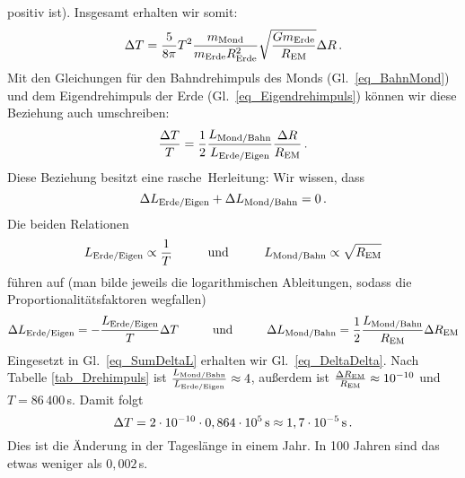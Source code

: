 positiv ist).  Insgesamt erhalten wir somit:
\begin{equation}
       \Delta T = \frac{5}{8 \pi} T^2  
                \frac{m_{\rm Mond}}{m_{\rm Erde}R_{\rm Erde}^2} \sqrt{ \frac{G m_{\rm Erde}}{R_{\rm EM}}} \Delta R \, .
\end{equation}
Mit den Gleichungen f\"ur den Bahndrehimpuls des Monds (Gl.\ \ref{eq_BahnMond}) und dem Eigendrehimpuls
der Erde (Gl.\ \ref{eq_Eigendrehimpuls}) k\"onnen wir diese Beziehung auch umschreiben:
\begin{equation}
\label{eq_DeltaDelta}
      \frac{ \Delta T}{T}  = \frac{1}{2}  
                \frac{L_{\rm Mond/Bahn}}{L_{\rm Erde/Eigen}} \frac{\Delta R}{R_{\rm EM}} \, .
\end{equation}
Diese Beziehung besitzt eine \glqq rasche\grqq\ Herleitung: Wir wissen, dass
\begin{equation}
\label{eq_SumDeltaL}
                \Delta L_{\rm Erde/Eigen} + \Delta L_{\rm Mond/Bahn} = 0  \, .
\end{equation}
Die beiden Relationen
\begin{equation}
       L_{\rm Erde/Eigen} \propto \frac{1}{T}  \hspace{1cm} {\rm und} \hspace{1cm}  
       L_{\rm Mond/Bahn} \propto  \sqrt{R_{\rm EM}}  
\end{equation}
f\"uhren auf (man bilde jeweils die logarithmischen Ableitungen, sodass die Proportionalit\"atsfaktoren wegfallen)
\begin{equation}
       \Delta L_{\rm Erde/Eigen} = - \frac{L_{\rm Erde/Eigen}}{T} \Delta T   \hspace{1cm} {\rm und} \hspace{1cm}  
       \Delta L_{\rm Mond/Bahn} =  \frac{1}{2} \frac{L_{\rm Mond/Bahn}}{R_{\rm EM}} \Delta R_{\rm EM} 
\end{equation}
Eingesetzt in Gl.\ \ref{eq_SumDeltaL} erhalten wir Gl.\ \ref{eq_DeltaDelta}. Nach Tabelle \ref{tab_Drehimpuls}
ist $\frac{L_{\rm Mond/Bahn}}{L_{\rm Erde/Eigen}} \approx 4$, au\ss erdem ist $\frac{\Delta R_{\rm EM}}{R_{\rm EM}}
\approx 10^{-10}$ und $T=86\,400$\,s. Damit folgt
\begin{equation}
             \Delta T =  2 \cdot 10^{-10} \cdot 0,864 \cdot 10^5\,{\rm s} \approx 1,7 \cdot 10^{-5} \,{\rm s} \, .  
\end{equation}
Dies ist die \"Anderung in der Tagesl\"ange in einem Jahr. In 100 Jahren sind das etwas weniger als
$0,002$\,s. 

